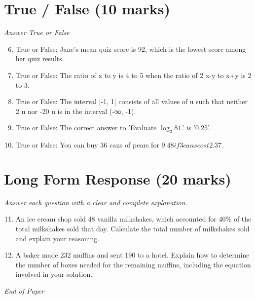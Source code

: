 \documentclass[12pt]{article}
\begin{document}
\section*{True / False (10 marks)}
\textit{Answer True or False}
\begin{enumerate}[label=\arabic*.]
\setcounter{enumi}{5}
\item True or False: Jane's mean quiz score is 92, which is the lowest score among her quiz results.
\item True or False: The ratio of x to y is 4 to 5 when the ratio of 2 x-y to x+y is 2 to 3.
\item True or False: The interval [-1, 1] consists of all values of u such that neither 2 u nor -20 u is in the interval (-∞, -1).
\item True or False: The correct answer to 'Evaluate $\log_3 81$.' is '0.25'.
\item True or False: You can buy 36 cans of pears for $9.48 if 3 cans cost $2.37.
\end{enumerate}

\section*{Long Form Response (20 marks)}
\textit{Answer each question with a clear and complete explanation.}
\begin{enumerate}[label=\arabic*.]
\setcounter{enumi}{10}
\item An ice cream shop sold 48 vanilla milkshakes, which accounted for 40\% of the total milkshakes sold that day. Calculate the total number of milkshakes sold and explain your reasoning.
\item A baker made 232 muffins and sent 190 to a hotel. Explain how to determine the number of boxes needed for the remaining muffins, including the equation involved in your solution.
\end{enumerate}

\vfill
\noindent\textit{End of Paper}
\end{document}
